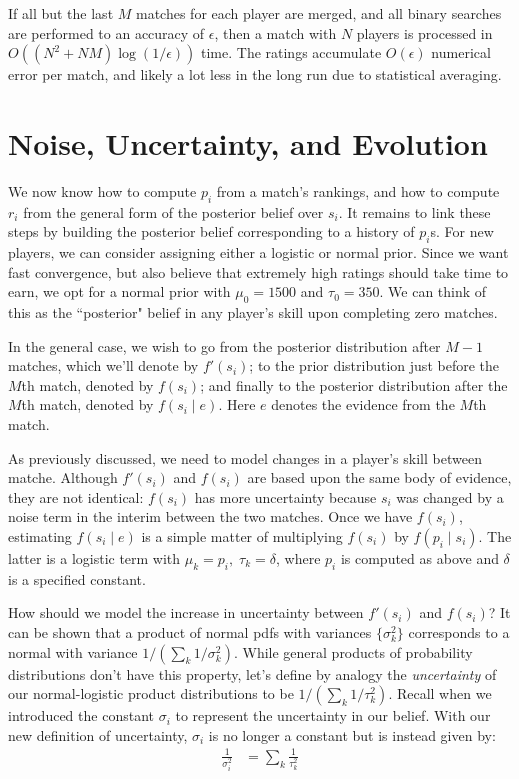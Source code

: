 \documentclass{article}
\begin{document}
If all but the last $M$ matches for each player are merged, and all binary searches are performed to an accuracy of $\epsilon$, then a match with $N$ players is processed in $O((N^2+NM)\log(1/\epsilon))$ time. The ratings accumulate $O(\epsilon)$ numerical error per match, and likely a lot less in the long run due to statistical averaging.

\section{Noise, Uncertainty, and Evolution}

We now know how to compute $p_i$ from a match's rankings, and how to compute $r_i$ from the general form of the posterior belief over $s_i$. It remains to link these steps by building the posterior belief corresponding to a history of $p_i$s. For new players, we can consider assigning either a logistic or normal prior. Since we want fast convergence, but also believe that extremely high ratings should take time to earn, we opt for a normal prior with $\mu_0 = 1500$ and $\tau_0 = 350$. We can think of this as the ``posterior" belief in any player's skill upon completing zero matches.

In the general case, we wish to go from the posterior distribution after $M-1$ matches, which we'll denote by $f'(s_i)$; to the prior distribution just before the $M$th match, denoted by $f(s_i)$; and finally to the posterior distribution after the $M$th match, denoted by $f(s_i \mid e)$. Here $e$ denotes the evidence from the $M$th match.

As previously discussed, we need to model changes in a player's skill between matche. Although $f'(s_i)$ and $f(s_i)$ are based upon the same body of evidence, they are not identical: $f(s_i)$ has more uncertainty because $s_i$ was changed by a noise term in the interim between the two matches. Once we have $f(s_i)$, estimating $f(s_i \mid e)$ is a simple matter of multiplying $f(s_i)$ by $f(p_i \mid s_i)$. The latter is a logistic term with $\mu_k = p_i,\;\tau_k=\delta$, where $p_i$ is computed as above and $\delta$ is a specified constant.

How should we model the increase in uncertainty between $f'(s_i)$ and $f(s_i)$? It can be shown that a product of normal pdfs with variances $\{\sigma_k^2\}$ corresponds to a normal with variance $1/(\sum_k 1/\sigma_k^2)$. While general products of probability distributions don't have this property, let's define by analogy the \emph{uncertainty} of our normal-logistic product distributions to be $1/(\sum_k 1/\tau_k^2)$. Recall when we introduced the constant $\sigma_i$ to represent the uncertainty in our belief. With our new definition of uncertainty, $\sigma_i$ is no longer a constant but is instead given by:
\begin{align}
\frac{1}{\sigma_i^2} &= \sum_k \frac{1}{\tau_k^2}
\end{align}
\end{document}
